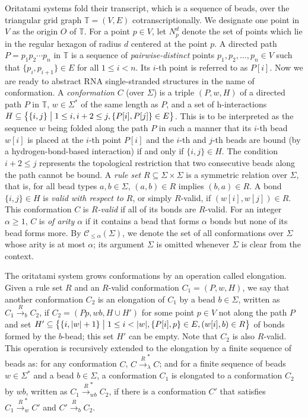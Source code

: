 \documentclass[runningheads]{llncs}
\begin{document}
Oritatami systems fold their transcript, which is a sequence of beads, over the triangular grid graph $\mathbb{T} = (V, E)$ cotranscriptionally. 
We designate one point in $V$ as the origin $O$ of $\mathbb{T}$. 
For a point $p \in V$, let $N_p^d$ denote the set of points which lie in the regular hexagon of radius $d$ centered at the point $p$. 
A directed path $P = p_1 p_2 \cdots p_n$ in $\mathbb{T}$ is a sequence of \textit{pairwise-distinct} points $p_1, p_2, \ldots, p_n \in V$ such that $\{p_i, p_{i+1}\} \in E$ for all $1 \le i < n$. 
Its $i$-th point is referred to as $P[i]$. 
Now we are ready to abstract RNA single-stranded structures in the name of conformation. 
A \textit{conformation} $C$ (over $\Sigma$) is a triple $(P, w, H)$ of a directed path $P$ in $\mathbb{T}$, $w \in \Sigma^*$ of the same length as $P$, and a set of h-interactions $H \subseteq \bigl\{\{i, j\} \bigm| 1 \le i, i+2 \le j, \{P[i], P[j]\} \in E \bigr\}$. 
This is to be interpreted as the sequence $w$ being folded along the path $P$ in such a manner that its $i$-th bead $w[i]$ is placed at the $i$-th point $P[i]$ and the $i$-th and $j$-th beads are bound (by a hydrogen-bond-based interaction) if and only if $\{i, j\} \in H$. 
The condition $i+2 \le j$ represents the topological restriction that two consecutive beads along the path cannot be bound. 
A \textit{rule set} $R \subseteq \Sigma \times \Sigma$ is a symmetric relation over $\Sigma$, that is, for all bead types $a, b \in \Sigma$, $(a, b) \in R$ implies $(b, a) \in R$. 
A bond $\{i, j\} \in H$ is \textit{valid with respect to $R$}, or simply $R$-valid, if $(w[i], w[j]) \in R$. 
This conformation $C$ is \textit{$R$-valid} if all of its bonds are $R$-valid. 
For an integer $\alpha \ge 1$, $C$ is \textit{of arity $\alpha$} if it contains a bead that forms $\alpha$ bonds but none of its bead forms more. 
By $\mathcal{C}_{\le \alpha}(\Sigma)$, we denote the set of all conformations over $\Sigma$ whose arity is at most $\alpha$; its argument $\Sigma$ is omitted whenever $\Sigma$ is clear from the context. 

The oritatami system grows conformations by an operation called elongation. 
Given a rule set $R$ and an $R$-valid conformation $C_1 = (P, w, H)$, we say that another conformation $C_2$ is an elongation of $C_1$ by a bead $b \in \Sigma$, written as $C_1 \xrightarrow{R}_b C_2$, if $C_2 = (P p, wb, H \cup H')$ for some point $p \in V$ not along the path $P$ and set $H' \subseteq \bigl\{ \{i, |w|+1\} \bigm| 1 \le i < |w|, \{P[i], p\} \in E, (w[i], b) \in R \bigr\}$ of bonds formed by the $b$-bead; this set $H'$ can be empty. 
Note that $C_2$ is also $R$-valid. 
This operation is recursively extended to the elongation by a finite sequence of beads as: for any conformation $C$, $C \xrightarrow{R}_\lambda^* C$; and for a finite sequence of beads $w \in \Sigma^*$ and a bead $b \in \Sigma$, a conformation $C_1$ is elongated to a conformation $C_2$ by $wb$, written as $C_1 \xrightarrow{R}_{wb}^* C_2$, if there is a conformation $C'$ that satisfies $C_1 \xrightarrow{R}_w^* C'$ and $C' \xrightarrow{R}_b C_2$. 
\end{document}
